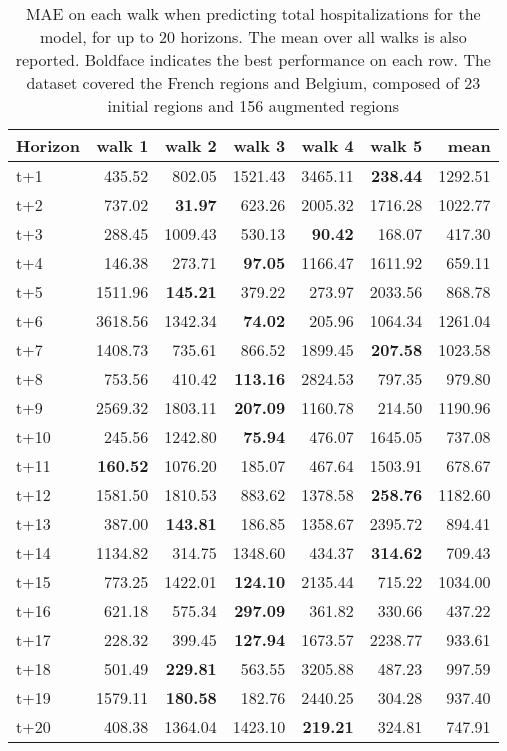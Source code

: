 \begin{table}[H]
\centering
\caption{MAE on each walk when predicting total hospitalizations for the model, for up to 20 horizons. The mean over all walks is also reported. Boldface indicates the best performance on each row. The dataset covered the French regions and Belgium, composed of 23 initial regions and 156 augmented regions }
\label{tab:MAE_walk_dense_model}
\begin{tabular}{lrrrrrr}
\toprule
Horizon &  walk 1 &  walk 2 &  walk 3 &  walk 4 &  walk 5 &    mean \\
\midrule
t+1  & 435.52  & 802.05  & 1521.43  & 3465.11  & \textbf{238.44}  & 1292.51  \\
t+2  & 737.02  & \textbf{31.97}  & 623.26  & 2005.32  & 1716.28  & 1022.77  \\
t+3  & 288.45  & 1009.43  & 530.13  & \textbf{90.42}  & 168.07  & 417.30  \\
t+4  & 146.38  & 273.71  & \textbf{97.05}  & 1166.47  & 1611.92  & 659.11  \\
t+5  & 1511.96  & \textbf{145.21}  & 379.22  & 273.97  & 2033.56  & 868.78  \\
t+6  & 3618.56  & 1342.34  & \textbf{74.02}  & 205.96  & 1064.34  & 1261.04  \\
t+7  & 1408.73  & 735.61  & 866.52  & 1899.45  & \textbf{207.58}  & 1023.58  \\
t+8  & 753.56  & 410.42  & \textbf{113.16}  & 2824.53  & 797.35  & 979.80  \\
t+9  & 2569.32  & 1803.11  & \textbf{207.09}  & 1160.78  & 214.50  & 1190.96  \\
t+10  & 245.56  & 1242.80  & \textbf{75.94}  & 476.07  & 1645.05  & 737.08  \\
t+11  & \textbf{160.52}  & 1076.20  & 185.07  & 467.64  & 1503.91  & 678.67  \\
t+12  & 1581.50  & 1810.53  & 883.62  & 1378.58  & \textbf{258.76}  & 1182.60  \\
t+13  & 387.00  & \textbf{143.81}  & 186.85  & 1358.67  & 2395.72  & 894.41  \\
t+14  & 1134.82  & 314.75  & 1348.60  & 434.37  & \textbf{314.62}  & 709.43  \\
t+15  & 773.25  & 1422.01  & \textbf{124.10}  & 2135.44  & 715.22  & 1034.00  \\
t+16  & 621.18  & 575.34  & \textbf{297.09}  & 361.82  & 330.66  & 437.22  \\
t+17  & 228.32  & 399.45  & \textbf{127.94}  & 1673.57  & 2238.77  & 933.61  \\
t+18  & 501.49  & \textbf{229.81}  & 563.55  & 3205.88  & 487.23  & 997.59  \\
t+19  & 1579.11  & \textbf{180.58}  & 182.76  & 2440.25  & 304.28  & 937.40  \\
t+20  & 408.38  & 1364.04  & 1423.10  & \textbf{219.21}  & 324.81  & 747.91  \\

\bottomrule
\end{tabular}
\end{table}
